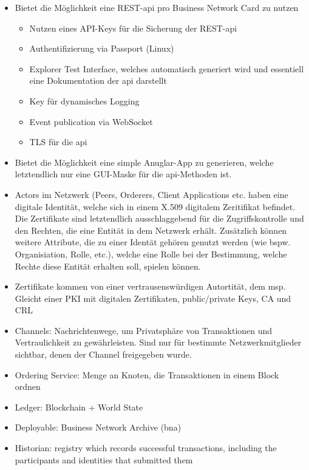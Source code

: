         \begin{itemize}[noitemsep]
            \item Bietet die Möglichkeit eine REST-\gls{api} pro Business Network Card zu nutzen
                \begin{itemize}[noitemsep]
                    \item Nutzen eines API-Keys für die Sicherung der REST-\gls{api}
                    \item Authentifizierung via Passport (Linux)
                    \item Explorer Test Interface, welches automatisch generiert wird und essentiell eine Dokumentation der \gls{api} darstellt
                    \item Key für dynamisches Logging
                    \item Event publication via WebSocket
                    \item TLS für die \gls{api}
                \end{itemize}
            \item Bietet die Möglichkeit eine simple Anuglar-App zu generieren, welche letztendlich nur eine GUI-Maske für die \gls{api}-Methoden ist.
            \item Actors im Netzwerk (Peers, Orderers, Client Applications etc. haben eine digitale Identität, welche sich in einem X.509 digitalem Zeritifikat befindet.
                Die Zertifikate sind letztendlich ausschlaggebend für die Zugriffskontrolle und den Rechten, die eine Entität in dem Netzwerk erhält. 
                Zusätzlich können weitere Attribute, die zu einer Identät gehören genutzt werden (wie bspw. Organisiation, Rolle, etc.), welche eine Rolle bei der Bestimmung, welche Rechte diese Entität erhalten soll, spielen können.
            \item Zertifikate kommen von einer vertrausenswürdigen Autortität, dem \gls{msp}. 
                Gleicht einer PKI mit digitalen Zertifikaten, public/\-private Keys, CA und CRL
            \item Channels: Nachrichtenwege, um Privatsphäre von Transaktionen und Vertraulichkeit zu gewährleisten.
                Sind nur für bestimmte Netzwerkmitglieder sichtbar, denen der Channel freigegeben wurde.
            \item Ordering Service: Menge an Knoten, die Transaktionen in einem Block ordnen
            \item Ledger: Blockchain + World State
            \item Deployable: Business Network Archive (bna)
            \item Historian: registry which records successful transactions, including the participants and identities that submitted them
        \end{itemize}
        
